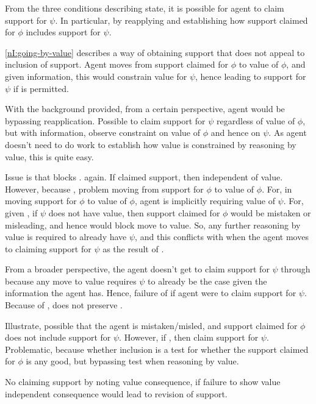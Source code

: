 \begin{note}
  From the three conditions describing state, it is possible for agent to claim support for \(\psi\).
  In particular, by reapplying and establishing how support claimed for \(\phi\) includes support for \(\psi\).

  \ref{nI:going-by-value} describes a way of obtaining support that does not appeal to inclusion of support.
  Agent moves from support claimed for \(\phi\) to value of \(\phi\), and given information, this would constrain value for \(\psi\), hence leading to support for \(\psi\) if \RBV{} is permitted.

  With the background provided, from a certain perspective, agent would be bypassing reapplication.
  Possible to claim support for \(\psi\) regardless of value of \(\phi\), but with information, observe constraint on value of \(\phi\) and hence on \(\psi\).
  As agent doesn't need to do work to establish how value is constrained by reasoning by value, this is quite easy.

  Issue is that \incl{} blocks \RBV{}.
  \eiS{} again.
  If claimed support, then independent of value.
  However, because \incl{}, problem moving from support for \(\phi\) to value of \(\phi\).
  For, in moving support for \(\phi\) to value of \(\phi\), agent is implicitly requiring value of \(\psi\).
  For, given \incl{}, if \(\psi\) does not have value, then support claimed for \(\phi\) would be mistaken or misleading, and hence would block move to value.
  So, any further reasoning by value is required to already have \(\psi\), and this conflicts with \eiS{} when the agent moves to claiming support for \(\psi\) as the result of \RBV{}.

  From a broader perspective, the agent doesn't get to claim support for \(\psi\) through \RBV{} because any move to value requires \(\psi\) to already be the case given the information the agent has.
  Hence, failure of \eiS{} if agent were to claim support for \(\psi\).
  Because of \incl{}, \RBV{} does not preserve \eiS{}.

  Illustrate, possible that the agent is mistaken/misled, and support claimed for \(\phi\) does not include support for \(\psi\).
  However, if \RBV{}, then claim support for \(\psi\).
  Problematic, because whether inclusion is a test for whether the support claimed for \(\phi\) is any good, but bypassing test when reasoning by value.

  No claiming support by noting value consequence, if failure to show value independent consequence would lead to revision of support.
\end{note}


